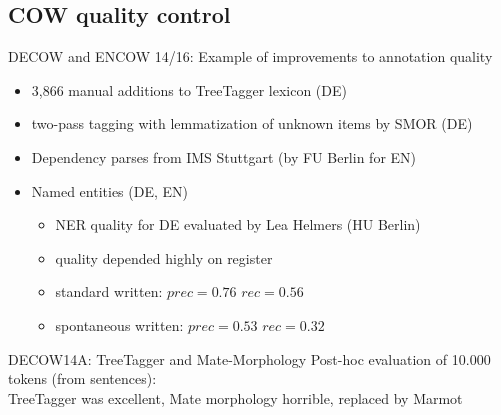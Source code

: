 \subsection{COW quality control}

\begin{frame}
  {DECOW and ENCOW 14\slash 16: Example of improvements to annotation quality}
  \begin{itemize}
    \item 3,866 manual additions to TreeTagger lexicon (DE)
    \item two-pass tagging with lemmatization of unknown items by SMOR (DE)
    \item Dependency parses from IMS Stuttgart (by FU Berlin for EN)

	\vspace{0.5cm}

    \item Named entities (DE, EN)

    \begin{itemize}
		\item NER quality for DE evaluated by Lea Helmers (HU Berlin)
		\item quality depended highly on register
		\item standard written: $prec=0.76$ $rec=0.56$
		\item spontaneous written: $prec=0.53$ $rec=0.32$
      \end{itemize}
  \end{itemize}
\end{frame}



\begin{frame}
  {DECOW14A: TreeTagger and Mate-Morphology}
  Post-hoc evaluation of 10.000 tokens (from sentences):\\
  TreeTagger was excellent, Mate morphology horrible, replaced by Marmot
  \vspace{0.5cm}
  \begin{center}
  \end{center}
 
\end{frame}



